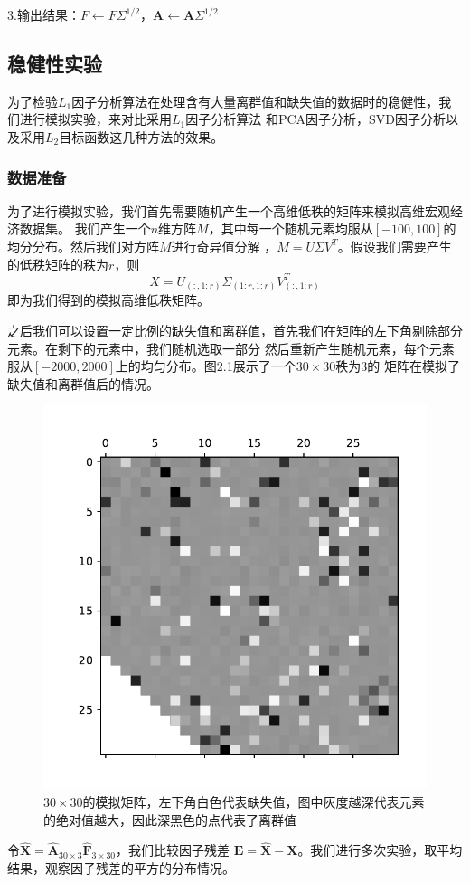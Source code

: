 3.输出结果：$F \leftarrow F\Sigma^{1/2}$，$\bm{A} \leftarrow \bm{A}\Sigma^{1/2}$

\subsection{稳健性实验}
为了检验$L_1$因子分析算法在处理含有大量离群值和缺失值的数据时的稳健性，我们进行模拟实验，来对比采用$L_1$因子分析算法
和PCA因子分析，SVD因子分析以及采用$L_2$目标函数这几种方法的效果。

\subsubsection{数据准备}
为了进行模拟实验，我们首先需要随机产生一个高维低秩的矩阵来模拟高维宏观经济数据集。
我们产生一个$n$维方阵$M$，其中每一个随机元素均服从$[-100, 100]$的均分分布。然后我们对方阵$M$进行奇异值分解
，$M = U\Sigma V^{T}$。假设我们需要产生的低秩矩阵的秩为$r$，则$$X = U_{(:,1:r)}\Sigma_{(1:r,1:r)}V^T_{(:,1:r)}$$
即为我们得到的模拟高维低秩矩阵。

之后我们可以设置一定比例的缺失值和离群值，首先我们在矩阵的左下角剔除部分元素。在剩下的元素中，我们随机选取一部分
然后重新产生随机元素，每个元素服从$[-2000,2000]$上的均匀分布。图2.1展示了一个$30\times30$秩为3的
矩阵在模拟了缺失值和离群值后的情况。

\begin{figure}[H]
    \centering
    \includegraphics[width=.5\textwidth]{pics/matrix.pdf}
    \caption{\small $30\times30$的模拟矩阵，左下角白色代表缺失值，图中灰度越深代表元素的绝对值越大，因此深黑色的点代表了离群值}
    \label{fig2.1}
\end{figure}

令$\hat{\bm{X}} = \hat{\bm{A}}_{30 \times 3}\hat{\bm{F}}_{3 \times 30}$，我们比较因子残差
$\bm{E} = \hat{\bm{X}} -\bm{X}$。我们进行多次实验，取平均结果，观察因子残差的平方的分布情况。

